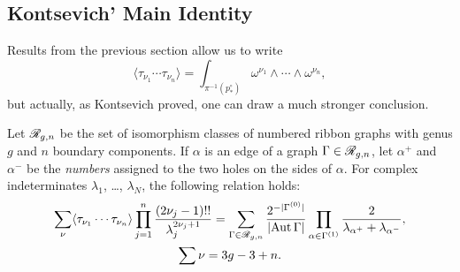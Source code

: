 \subsection{Kontsevich' Main Identity}
\label{sec:KMI}

Results from the previous section allow us to write
\begin{equation}
  \label{eq:kontsevich-6}
  \langle \tau_{\nu_1} \cdots \tau_{\nu_n} \rangle = \int_{\pi^{-1}(p^\circ_*)} \omega^{\nu_1} \land \cdots
  \land \omega^{\nu_n},
\end{equation}
but actually, as Kontsevich proved, one can draw a much stronger
conclusion. 

\begin{theorem}
  Let $\RG[g,n]$ be the set of isomorphism classes of numbered
  ribbon graphs with genus $g$ and $n$ boundary components. If
  $\alpha$ is an edge of a graph $\Gamma \in \RG[g,n]$, let $\alpha^+$
  and $\alpha^-$ be the \emph{numbers} assigned to the two holes on
  the sides of $\alpha$. For complex indeterminates $\lambda_1$,
  \ldots, $\lambda_N$, the following relation holds:
  \begin{multline*}
    \sum_\nu \langle \tau_{\nu_1} \cdots \tau_{\nu_n} \rangle \prod_{j=1}^n \frac {(2\nu_j - 1)!!}
    {\lambda_j^{2\nu_j + 1}} = \sum_{\Gamma \in \RG[g,n]} \frac
    {2^{-\card{\Vertices{\Gamma}}}} {\card{\Aut \Gamma}} \prod_{\alpha \in \Edges{\Gamma}}
    \frac {2} {\lambda_{\alpha^+} + \lambda_{\alpha^-}}, 
    \\ \sum \nu = 3g - 3 + n.
  \end{multline*}
\end{theorem}
